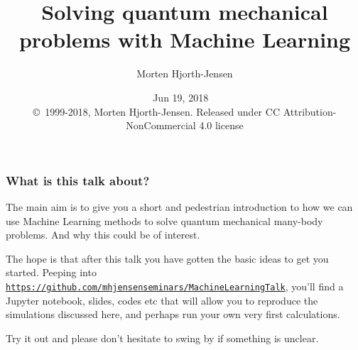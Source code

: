 \documentclass{beamer}
\begin{document}

\newcommand{\exercisesection}[1]{\subsection*{#1}}







\title{Solving quantum mechanical problems with Machine Learning}


\author{Morten Hjorth-Jensen}

\date{Jun 19, 2018 
\ \\ 
{\tiny \copyright\ 1999-2018, Morten Hjorth-Jensen. Released under CC Attribution-NonCommercial 4.0 license}
}

\begin{frame}
\titlepage
\end{frame}

\begin{frame}
\frametitle{What is this talk about?}

\begin{block}{}
The main aim is to give you a short and pedestrian introduction to  how we can use Machine Learning methods
to solve quantum mechanical many-body problems. And why this could be of interest. 

The hope is that after this talk you have gotten the basic ideas to get you started. Peeping into \href{{https://github.com/mhjensenseminars/MachineLearningTalk}}{\nolinkurl{https://github.com/mhjensenseminars/MachineLearningTalk}}, you'll find a Jupyter notebook, slides, codes etc that will allow you to reproduce the simulations discussed here, and perhaps run your own very first calculations.

Try it out and please don't hesitate to swing by if something is unclear.
\end{block}
\end{frame}
\end{document}
